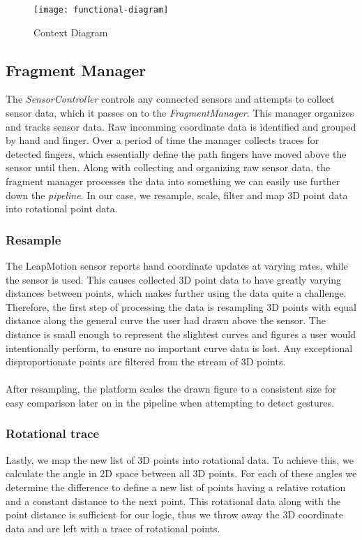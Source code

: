 \documentclass{standalone}
\begin{document}
  \begin{figure}[h]
    \centering
      \texttt{[image: functional-diagram]}
    \caption{Context Diagram}
    \label{fig:pipeline-diagram}
  \end{figure}

  \subsection{Fragment Manager}
  The \emph{SensorController} controls any connected sensors and attempts to
  collect sensor data, which it passes on to the \emph{FragmentManager}. This
  manager organizes and tracks sensor data. Raw incomming coordinate data is
  identified and grouped by hand and finger. Over a period of time the manager
  collects traces for detected fingers, which essentially define the path
  fingers have moved above the sensor until then. Along with collecting and
  organizing raw sensor data, the fragment manager processes the data into
  something we can easily use further down the \emph{pipeline}. In our case, we
  resample, scale, filter and map 3D point data into rotational point data.

  \subsubsection{Resample}
  The LeapMotion sensor reports hand coordinate updates at varying rates, while
  the sensor is used. This causes collected 3D point data to have greatly
  varying distances between points, which makes further using the data quite a
  challenge. Therefore, the first step of processing the data is resampling 3D
  points with equal distance along the general curve the user had drawn above
  the sensor. The distance is small enough to represent the slightest curves and
  figures a user would intentionally perform, to ensure no important curve data
  is lost. Any exceptional disproportionate points are filtered from the stream
  of 3D points.

  \paragraph{}
  After resampling, the platform scales the drawn figure to a consistent size
  for easy comparison later on in the pipeline when attempting to detect
  gestures.

  \subsubsection{Rotational trace}
  Lastly, we map the new list of 3D points into rotational data. To achieve
  this, we calculate the angle in 2D space between all 3D points. For each of
  these angles we determine the difference to define a new list of points having
  a relative rotation and a constant distance to the next point.
  This rotational data along with the point distance is sufficient for our logic,
  thus we throw away the 3D coordinate data and are left with a trace of
  rotational points.
\end{document}
